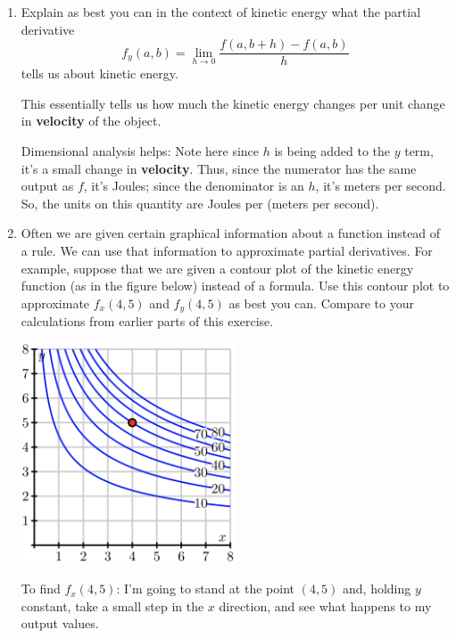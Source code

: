 \documentclass[10pt]{article}
\newenvironment{red}{\color{red}}{\ignorespacesafterend}
\begin{document}
\begin{enumerate}[leftmargin=0pt]
\begin{enumerate}
\begin{red}
            
        \end{red}
        
        \item Explain as best you can in the context of kinetic energy what the partial derivative
        \[f_{y}(a, b)=\lim _{h \rightarrow 0} \frac{f(a, b+h)-f(a, b)}{h}\]
        tells us about kinetic energy.
        
        \begin{red}
            This essentially tells us how much the kinetic energy changes per unit change in \textbf{velocity} of the object. 
            
            Dimensional analysis helps: Note here since $h$ is being added to the $y$ term, it's a small change in \textbf{velocity}. Thus, since the numerator has the same output as $f$, it's Joules; since the denominator is an $h$, it's meters per second. So, the units on this quantity are Joules per (meters per second).
        \end{red}
        
        \item Often we are given certain graphical information about a function instead of a rule. We can use that information to approximate partial derivatives. For example, suppose that we are given a contour plot of the kinetic energy function (as in the figure below) instead of a formula. Use this contour plot to approximate $f_x(4, 5)$ and $f_y(4, 5)$ as best you can. Compare to your calculations from earlier parts of this exercise.
        
        \begin{center}
            \includegraphics[width=0.5\textwidth]{2-2-14.png}
        \end{center}
        
        \begin{red}
            To find $f_x(4,5)$: I'm going to stand at the point $(4,5)$ and, holding $y$ constant, take a small step in the $x$ direction, and see what happens to my output values.
            

\end{red}
\end{enumerate}
\end{enumerate}
\end{document}

